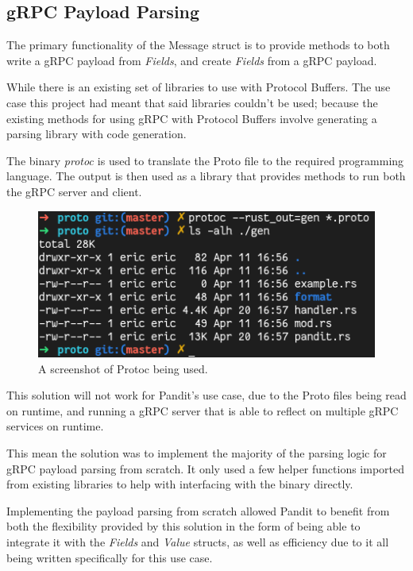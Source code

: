 \documentclass[a4paper,12pt]{report}
\begin{document}
\subsection{gRPC Payload Parsing}

The primary functionality of the Message struct is to provide methods to both write a gRPC payload from \textit{Fields}, and create \textit{Fields}
from a gRPC payload.

While there is an existing set of libraries to use with Protocol Buffers. The use case this project had meant that said libraries couldn't be used;
 because the existing methods for using gRPC with Protocol Buffers involve generating a parsing library with code generation.

The binary \textit{protoc \cite{protoc}} is used to translate the Proto file to the required programming language. The output is then used as
a library that provides methods to run both the gRPC server and client.

\begin{figure}[hbt!]
    \centering
    \includegraphics[width=\linewidth]{protocc.png}
    \caption{A screenshot of Protoc being used.}
    \label{fig:admin}
\end{figure}
\newpage

This solution will not work for Pandit’s use case, due to the Proto files
being read on runtime, and running a gRPC server that is able to reflect on
multiple gRPC services on runtime.

This mean the solution was to implement the majority of the parsing logic for gRPC payload parsing from scratch. It only used a few helper functions imported from existing libraries to help with interfacing with the binary directly.

Implementing the payload parsing from scratch allowed Pandit to benefit from both the flexibility provided by this solution in the form of being able to integrate it with the \textit{Fields} and \textit{Value} structs, as well as efficiency due to it all being written specifically for this use case.
\end{document}

